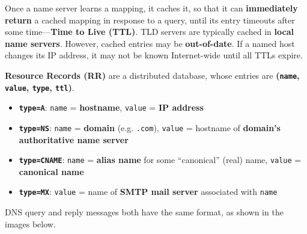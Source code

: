 \documentclass[12pt,a4paper]{article}
\begin{document}

\noindent Once a name server learns a mapping, it caches it, so that it can \textbf{immediately return} a cached mapping in response to a query, until its entry timeouts after some time---\textbf{Time to Live (TTL)}. TLD servers are typically cached in \textbf{local name servers}. However, cached entries may be \textbf{out-of-date}. If a named host changes its IP address, it may not be known Internet-wide until all TTLs expire. \\


\noindent \textbf{Resource Records (RR)} are a distributed database, whose entries are \textbf{(\texttt{name}, \texttt{value}, \texttt{type}, \texttt{ttl})}.

\begin{itemize}
  \item \textbf{\texttt{type=A}}: \texttt{name} = \textbf{hostname}, \texttt{value} = \textbf{IP address}
  \item \textbf{\texttt{type=NS}}: \texttt{name} = \textbf{domain} (e.g. \texttt{.com}), \texttt{value} = hostname of \textbf{domain's authoritative name server}
  \item \textbf{\texttt{type=CNAME}}: \texttt{name} = \textbf{alias name} for some ``canonical'' (real) name, \texttt{value} = \textbf{canonical name}
  \item \textbf{\texttt{type=MX}}: \texttt{value} = name of \textbf{SMTP mail server} associated with \texttt{name}
\end{itemize}


\noindent DNS query and reply messages both have the same format, as shown in the images below.
\end{document}
